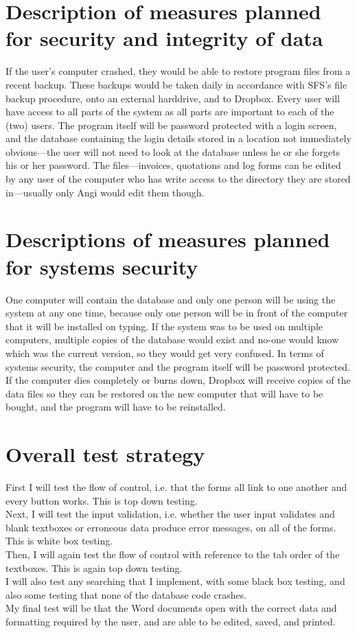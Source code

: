 	\section{Description of measures planned for security and integrity of data}
If the user's computer crashed, they would be able to restore program files from a recent backup.  These backups would be taken daily in accordance with SFS's file backup procedure, onto an external harddrive, and to Dropbox.  Every user will have access to all parts of the system as all parts are important to each of the (two) users.  The program itself will be password protected with a login screen, and the database containing the login details stored in a location not immediately obvious---the user will not need to look at the database unless he or she forgets his or her password.  The files---invoices, quotations and log forms can be edited by any user of the computer who has write access to the directory they are stored in---usually only Angi would edit them though.
	\section{Descriptions of measures planned for systems security}
One computer will contain the database and only one person will be using the system at any one time, because only one person will be in front of the computer that it will be installed on typing.  If the system was to be used on multiple computers, multiple copies of the database would exist and no-one would know which was the current version, so they would get very confused.  In terms of systems security, the computer and the program itself will be password protected.  If the computer dies completely or burns down, Dropbox will receive copies of the data files so they can be restored on the new computer that will have to be bought, and the program will have to be reinstalled.
	\section{Overall test strategy}
	
First I will test the flow of control, i.e. that the forms all link to one another and every button works.  This is top down testing.\\
Next, I will test the input validation, i.e. whether the user input validates and blank textboxes or erroneous data produce error messages, on all of the forms.  This is white box testing.\\
Then, I will again test the flow of control with reference to the tab order of the textboxes.  This is again top down testing.\\
I will also test any searching that I implement, with some black box testing, and also some testing that none of the database code crashes.\\
My final test will be that the Word documents open with the correct data and formatting required by the user, and are able to be edited, saved, and printed.